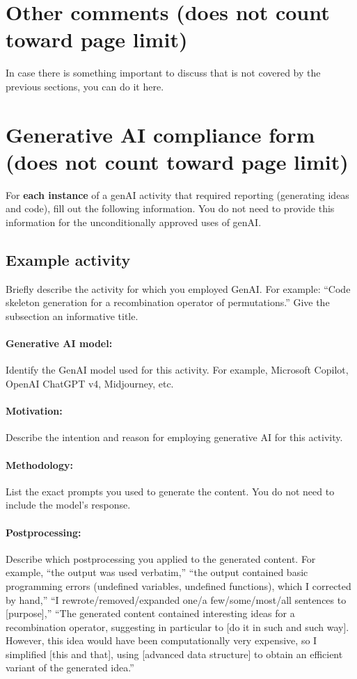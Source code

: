 \documentclass[a4paper,10pt]{article}
\newcommand{\ReplaceMe}[1]{{\color{blue}#1}}
\newcommand{\RemoveMe}[1]{{\color{purple}#1}}
\begin{document}
\section{Other comments \hfill(does not count toward page limit)} \label{sec_other}

\ReplaceMe{In case there is something important to discuss that is not covered by the previous sections, you can do it here. }

\section{Generative AI compliance form \hfill(does not count toward page limit)} \label{sec_genai}

\RemoveMe{For \textbf{each instance} of a genAI activity that required reporting (generating ideas and code), fill out the following information. You do not need to provide this information for the unconditionally approved uses of genAI.}

\subsection{Example activity} \ReplaceMe{Briefly describe the activity for which you employed GenAI. For example: ``Code skeleton generation for a recombination operator of permutations.'' Give the subsection an informative title.}

\paragraph{Generative AI model:} \ReplaceMe{Identify the GenAI model used for this activity. For example, Microsoft Copilot, OpenAI ChatGPT v4, Midjourney, etc.}

\paragraph{Motivation:} \ReplaceMe{Describe the intention and reason for employing generative AI for this activity.}

\paragraph{Methodology:} \ReplaceMe{List the exact prompts you used to generate the content. You do not need to include the model's response.}

\paragraph{Postprocessing:} \ReplaceMe{Describe which postprocessing you applied to the generated content. For example, ``the output was used verbatim,'' ``the output contained basic programming errors (undefined variables, undefined functions), which I corrected by hand,'' ``I rewrote/removed/expanded one/a few/some/most/all sentences to [purpose],'' ``The generated content contained interesting ideas for a recombination operator, suggesting in particular to [do it in such and such way]. However, this idea would have been computationally very expensive, so I simplified [this and that], using [advanced data structure] to obtain an efficient variant of the generated idea.''}
\end{document}
